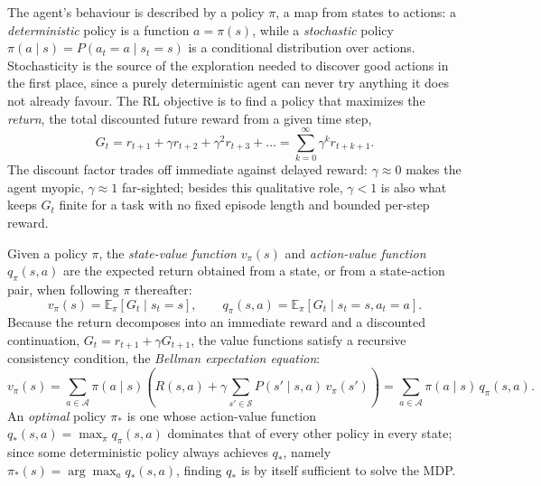 The agent's behaviour is described by a policy $\pi$, a map from states to actions: a \emph{deterministic} policy is a function $a = \pi(s)$, while a \emph{stochastic} policy $\pi(a \mid s) = P(a_t{=}a \mid s_t{=}s)$ is a conditional distribution over actions. Stochasticity is the source of the exploration needed to discover good actions in the first place, since a purely deterministic agent can never try anything it does not already favour. The RL objective is to find a policy that maximizes the \emph{return}, the total discounted future reward from a given time step,
\begin{equation}
G_t = r_{t+1} + \gamma r_{t+2} + \gamma^2 r_{t+3} + \dots = \sum_{k=0}^{\infty} \gamma^k r_{t+k+1}.
\end{equation}
The discount factor trades off immediate against delayed reward: $\gamma \approx 0$ makes the agent myopic, $\gamma \approx 1$ far-sighted; besides this qualitative role, $\gamma < 1$ is also what keeps $G_t$ finite for a task with no fixed episode length and bounded per-step reward.

Given a policy $\pi$, the \emph{state-value function} $v_\pi(s)$ and \emph{action-value function} $q_\pi(s,a)$ are the expected return obtained from a state, or from a state-action pair, when following $\pi$ thereafter:
\begin{equation}
v_\pi(s) = \mathbb{E}_\pi[G_t \mid s_t{=}s], \qquad q_\pi(s,a) = \mathbb{E}_\pi[G_t \mid s_t{=}s, a_t{=}a].
\end{equation}
Because the return decomposes into an immediate reward and a discounted continuation, $G_t = r_{t+1} + \gamma G_{t+1}$, the value functions satisfy a recursive consistency condition, the \emph{Bellman expectation equation}:
\begin{equation}
v_\pi(s) = \sum_{a \in \mathcal{A}} \pi(a\mid s) \left( R(s,a) + \gamma \sum_{s' \in \mathcal{S}} P(s'\mid s,a)\, v_\pi(s') \right) = \sum_{a\in\mathcal{A}} \pi(a\mid s)\, q_\pi(s,a).
\end{equation}
An \emph{optimal} policy $\pi_*$ is one whose action-value function $q_*(s,a) = \max_\pi q_\pi(s,a)$ dominates that of every other policy in every state; since some deterministic policy always achieves $q_*$, namely $\pi_*(s) = \arg\max_{a} q_*(s,a)$, finding $q_*$ is by itself sufficient to solve the MDP.

